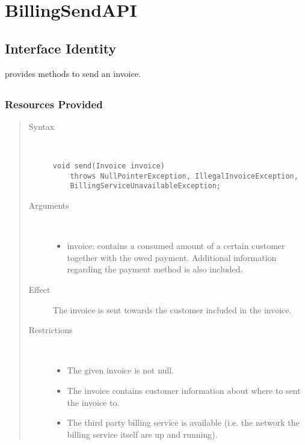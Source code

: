 \section{BillingSendAPI}
\label{api:other-billing-send-api}

\subsection{Interface Identity}

\npar {} provides methods to send an invoice.

\subsection{}

\subsubsection{Resources Provided}

\begin{quote}
	\begin{description}
		\item[Syntax] \ 
		\begin{verbatim}
void send(Invoice invoice)
    throws NullPointerException, IllegalInvoiceException,
    BillingServiceUnavailableException;
		\end{verbatim}
		\item[Arguments] \
		\begin{itemize}
			\item invoice: contains a consumed amount of a certain customer together with
			the owed payment. Additional information regarding the payment method is
			also included.
		\end{itemize}
		\item[Effect] The invoice is sent towards the customer included in the
		invoice.
		\item[Restrictions] \ 
		\begin{itemize}
			\item The given invoice is not null.
			\item The invoice contains customer information about where to sent the
			invoice to.
			\item The third party billing service is available (i.e. the network the
			billing service itself are up and running).
		\end{itemize}
	\end{description} 
\end{quote}

